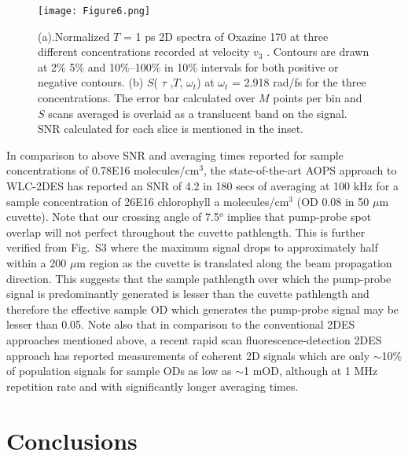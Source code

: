 \documentclass[%
aip,
amsmath,amssymb,
preprint,%
]{revtex4-2}
\begin{document}
\begin{figure}[hbt!]
\centering\texttt{[image: Figure6.png]}
\caption{(a).Normalized $T$ = 1 ps 2D spectra of Oxazine 170 at three different concentrations recorded at velocity $v$$_3$ . Contours are drawn at 2$\%$ 5$\%$ and
10$\%$–100$\%$ in 10$\%$ intervals for both positive or negative contours. (b) $S$( $\tau$ ,$T$, $\omega$$_t$) at $\omega$$_t$ = 2.918 rad/fs for the three concentrations. The error bar calculated over $M$ points per bin and $S$ scans averaged is overlaid as a translucent band on the signal. SNR calculated for each slice is mentioned in the inset.}
\label{fig:fig6}
\end{figure}

In comparison to above SNR and averaging times reported for sample concentrations of 0.78E16 molecules/cm$^3$, the state-of-the-art AOPS approach to WLC-2DES has reported\cite{Kearns2017} an SNR of 4.2 in 180 secs of averaging at 100 kHz for a sample concentration of 26E16 chlorophyll a molecules/cm$^3$ (OD 0.08 in 50 $\mu$m cuvette). Note that our crossing angle of 7.5$^o$ implies that pump-probe spot overlap will not perfect throughout the cuvette pathlength. This is further verified from Fig.~S3 where the maximum signal drops to approximately half within a 200 $\mu$m region as the cuvette is translated along the beam propagation direction. This suggests that the sample pathlength over which the pump-probe signal is predominantly generated is lesser than the cuvette pathlength and therefore the effective sample OD which generates the pump-probe signal may be lesser than 0.05. Note also that in comparison to the conventional 2DES approaches mentioned above, a recent rapid scan fluorescence-detection 2DES approach\cite{Sahu2023} has reported measurements of coherent 2D signals which are only $\sim$10\% of population signals for sample ODs as low as $\sim$1 mOD, although at 1 MHz repetition rate and with significantly longer averaging times.



\section{Conclusions}
\end{document}
